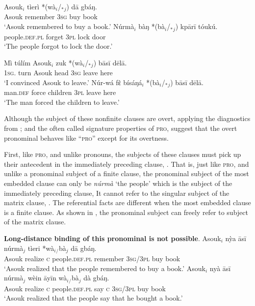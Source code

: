 \documentclass[output=paper,colorlinks,citecolor=brown]{langscibook}
\begin{document}
\ea%
    \label{ex:sulemana:16}
    \ea%
    \label{ex:sulemana:16a}
    \gll    Asouk$_i$ tìerì *(wà$_i$/$_*${}$_j$) dā gbáŋ.\\
            Asouk remember  \textsc{3sg} buy book\\
    \glt    `Asouk remembered to buy a book.'
    \ex%
    \label{ex:sulemana:16b}
    \gll    Núrmà$_i$ bàŋ *(bà$_i$/$_*${}$_j$) kpārī tóukú.\\
            people.\textsc{def.pl} forget \textsc{3pl} lock door\\
    \glt    `The people forgot to lock the door.' 
    \z
\z

\ea%
    \label{ex:sulemana:17}
    \ea%
    \label{ex:sulemana:17a}
    \gll    Mì túlím Asouk$_i$ zuk *(wà$_i$/$_*${}$_j$) bāsī dēlā.\\
            \textsc{1sg}. turn Asouk head \textsc{3sg} leave here\\
    \glt    `I convinced Asouk to leave.'
    \ex%
    \label{ex:sulemana:17b}
    \gll    Núr-wá fὲ  bísáŋá$_i$  *(bà$_i$/$_*${}$_j$) bāsī dēlā. \\
            man.\textsc{def} force children \textsc{3pl} leave here\\
    \glt    `The man forced the children to leave.' 
    \z
\z

Although the subject of these nonfinite clauses are overt, applying the diagnostics from  \citet{Hornstein1999, Landau2013}; and \citet{Williams1980} the often called  signature properties of \textsc{pro}, suggest that the overt pronominal behaves like ``\textsc{pro}'' except for its overtness.

First, like \textsc{pro}, and unlike pronouns, the subjects of these clauses must pick up their antecedent in the immediately preceding clause, . That is, just like \textsc{pro}, and unlike a pronominal subject of a finite clause, the pronominal subject of the most embedded clause can only  be {\it{núrmà}} `the people' which is the subject of the immediately preceding clause, It cannot refer to the singular subject of the matrix clause, . The referential facts are different when the most embedded clause is a finite clause. As shown in , the pronominal subject can freely refer to subject of the matrix clause. 

\ea%
    \label{ex:sulemana:18}
    {\bf{Long-distance binding of this pronominal is not possible}}.
    \ea%
    \label{ex:sulemana:18a}
    \gll    Asouk$_i$  nỳa  āsī núrmà$_j$ tìeri  *wà$_i${}$_/$bà$_j$ dā gbáŋ.\\
            Asouk realize \textsc{c} people.\textsc{def.pl} remember \textsc{3sg/3pl}  buy book\\
    \glt    `Asouk realized that the people remembered to buy a book.'
    \ex%
    \label{ex:sulemana:18b}
    \gll    Asouk$_i$ nyà āsī núrmà$_j$ wèin āyīn  wà$_i${}$_/$bà$_j$ dà gbáŋ.\\
            Asouk realize \textsc{c} people.\textsc{def.pl}  say \textsc{c} \textsc{3sg/3pl}  buy book\\
    \glt    `Asouk realized that the people say that he bought a book.' 
    \z
\z
\end{document}
